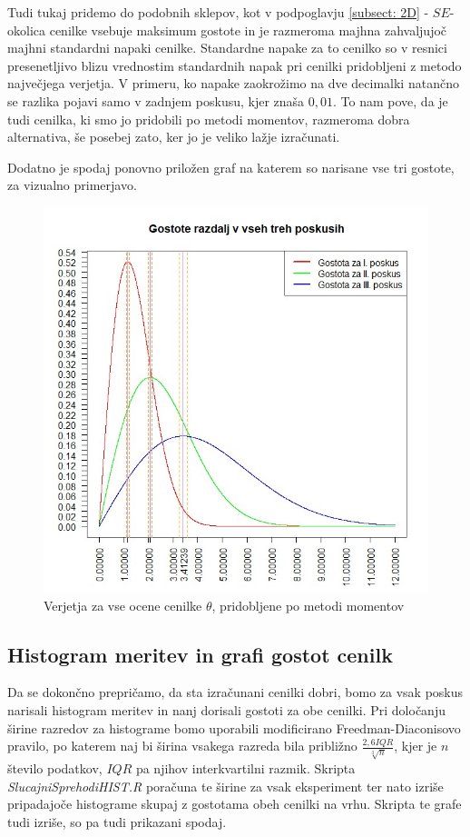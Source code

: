 \documentclass[a4paper, 10pt]{article}
\begin{document}
	Tudi tukaj pridemo do podobnih sklepov, kot v podpoglavju \ref{subsect: 2D} - $SE$-okolica cenilke vsebuje maksimum gostote in je razmeroma majhna zahvaljujoč majhni standardni napaki cenilke. Standardne napake za to cenilko so v resnici presenetljivo blizu vrednostim standardnih napak pri cenilki pridobljeni z metodo največjega verjetja. V primeru, ko napake zaokrožimo na dve decimalki natančno se razlika pojavi samo v zadnjem poskusu, kjer znaša $0{,}01$. To nam pove, da je tudi cenilka, ki smo jo pridobili po metodi momentov, razmeroma dobra alternativa, še posebej zato, ker jo je veliko lažje izračunati.
	
	Dodatno je spodaj ponovno priložen graf na katerem so narisane vse tri gostote, za vizualno primerjavo.
	\begin{figure}[h!]
		\label{fig: 2Eplot4}
		\centering
		\includegraphics[scale = 0.35]{VerjetjeMM4}
		\caption{Verjetja za vse ocene cenilke $\theta$, pridobljene po metodi momentov}
	\end{figure}
	
	\subsection{Histogram meritev in grafi gostot cenilk} \label{subsect: 2F}
	Da se dokončno prepričamo, da sta izračunani cenilki dobri, bomo za vsak poskus narisali histogram meritev in nanj dorisali gostoti za obe cenilki. Pri določanju širine razredov za histograme bomo uporabili modificirano Freedman-Diaconisovo pravilo, po katerem naj bi širina vsakega razreda bila približno $\frac{2{,}6IQR}{\sqrt[3]{n}}$, kjer je $n$ število podatkov, $IQR$ pa njihov interkvartilni razmik. Skripta \textit{SlucajniSprehodiHIST.R} poračuna te širine za vsak eksperiment ter nato izriše pripadajoče histograme skupaj z gostotama obeh cenilki na vrhu. Skripta te grafe tudi izriše, so pa tudi prikazani spodaj.
	
\end{document}
